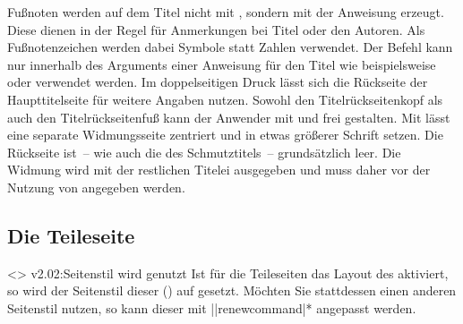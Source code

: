 \begin{DeclareEntity*}{}
\begin{DeclareEntity*}{}
\begin{DeclareEntity*}{}
\begin{Declaration}
\begin{Declaration}
\begin{Declaration}
\begin{Declaration}
\begin{Declaration}
\begin{Declaration}
\begin{Declaration}
\begin{Declaration}
Fußnoten werden auf dem Titel nicht mit , sondern mit der 
Anweisung  erzeugt. Diese dienen in der Regel für Anmerkungen bei 
Titel oder den Autoren. Als Fußnotenzeichen werden dabei Symbole statt Zahlen 
verwendet. Der Befehl  kann nur innerhalb des Arguments einer 
Anweisung für den Titel wie beispielsweise  oder  
verwendet werden.
%
Im doppelseitigen Druck lässt sich die Rückseite der Haupttitelseite für 
weitere Angaben nutzen. Sowohl den Titelrückseitenkopf als auch den
Titelrückseitenfuß kann der Anwender mit  und 
 frei gestalten. Mit  lässt eine 
separate Widmungsseite zentriert und in etwas größerer Schrift setzen. Die 
Rückseite ist~-- wie auch die des Schmutztitels~-- grundsätzlich leer. Die 
Widmung wird mit der restlichen Titelei ausgegeben und muss daher vor der 
Nutzung von  angegeben werden.
%
\end{Declaration}
\end{Declaration}
\end{Declaration}
\end{Declaration}
\end{Declaration}
\end{Declaration}
\end{Declaration}
\end{Declaration}



\subsection{%
  Die Teileseite%
  \label{sec:part}%
}
%
\ChangedAt<>{%
  v2.02:Seitenstil  wird genutzt%
}%
Ist für die Teileseiten das Layout des \CDs aktiviert, so wird der Seitenstil 
dieser () auf  gesetzt. 
Möchten Sie stattdessen einen anderen Seitenstil nutzen, so kann dieser mit 
\Macro||{renewcommand|*}
angepasst werden.


\end{DeclareEntity*}
\end{DeclareEntity*}
\end{DeclareEntity*}
